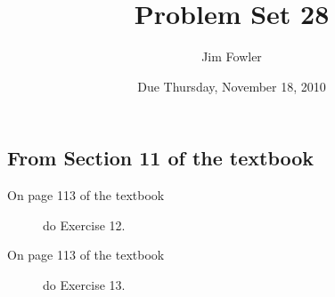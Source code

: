 \documentclass[12pt]{handout}
\author{Jim Fowler}
\title{Problem Set 28}
\date{Due Thursday, November 18, 2010}
\begin{document}
\maketitle










\subsection*{From Section 11 of the textbook}



\begin{description}

\item[On page 113 of the textbook] do Exercise 12.

\item[On page 113 of the textbook] do Exercise 13.

\end{description}
\end{document}
